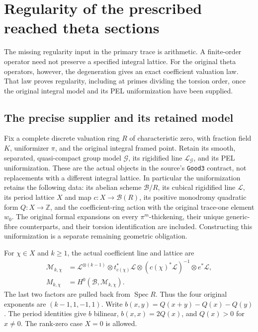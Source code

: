 \section{Regularity of the prescribed reached theta sections}
\label{sec:geometry-reached-regularity}

The missing regularity input in the primary trace is arithmetic.  A
finite-order operator need not preserve a specified integral lattice.
For the original theta operators, however, the degeneration gives an
exact coefficient valuation law.  That law proves regularity, including
at primes dividing the torsion order, once the original integral model
and its PEL uniformization have been supplied.

\subsection*{The precise supplier and its retained model}

Fix a complete discrete valuation ring $R$ of characteristic zero, with
fraction field $K$, uniformizer $\pi$, and the original integral framed
point.  Retain its smooth, separated, quasi-compact group model
$\mathcal G$, its rigidified line $\mathscr L_{\mathcal G}$, and its
PEL uniformization.  These are the actual objects in the source's
\texttt{Good3} contract, not replacements with a different integral
lattice.  In particular the uniformization retains the following data:
its abelian scheme $\mathcal B/R$, its cubical rigidified line
$\mathscr L$, its period lattice $X$ and map $c:X\to\mathcal B(R)$,
its positive monodromy quadratic form $Q:X\to\mathbb Z$, and the
coefficient-ring action with the original trace-one element $w_0$.
The original formal expansions on every $\pi^m$-thickening, their
unique generic-fibre counterparts, and their torsion identification
are included.  Constructing this uniformization is a separate remaining
geometric obligation.

For $\chi\in X$ and $k\geq1$, the actual coefficient line and lattice are
\begin{align*}
 \mathscr M_{k,\chi}
  &=\mathscr L^{\otimes(k-1)}\otimes t_{c(\chi)}^*\mathscr L
       \otimes(c(\chi)^*\mathscr L)^{-1}\otimes e^*\mathscr L,\\
 M_{k,\chi}&=H^0(\mathcal B,\mathscr M_{k,\chi}).
\end{align*}
The last two factors are pulled back from $\operatorname{Spec}R$.
Thus the four original exponents are $(k-1,1,-1,1)$.
Write $b(x,y)=Q(x+y)-Q(x)-Q(y)$.
The period identities give $b$ bilinear, $b(x,x)=2Q(x)$, and
$Q(x)>0$ for $x\ne0$.  The rank-zero case $X=0$ is allowed.

